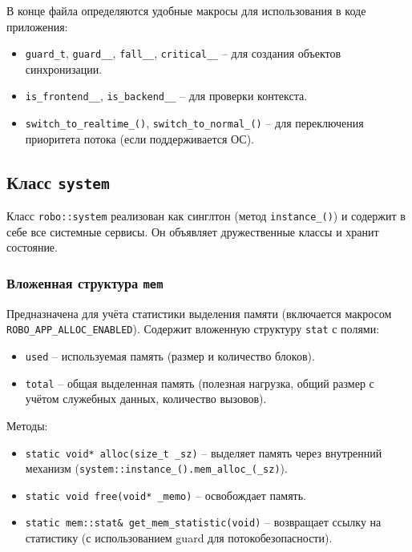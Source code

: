 \documentclass[a4paper,12pt]{article}
\begin{document}
В конце файла определяются удобные макросы для использования в коде приложения:
\begin{itemize}
    \item \texttt{guard\_t}, \texttt{guard\_\_}, \texttt{fall\_\_}, \texttt{critical\_\_} -- для создания объектов синхронизации.
    \item \texttt{is\_frontend\_\_}, \texttt{is\_backend\_\_} -- для проверки контекста.
    \item \texttt{switch\_to\_realtime\_()}, \texttt{switch\_to\_normal\_()} -- для переключения приоритета потока (если поддерживается ОС).
\end{itemize}

\subsection{Класс \texttt{system}}

Класс \texttt{robo::system} реализован как синглтон (метод \texttt{instance\_()}) и содержит в себе все системные сервисы. Он объявляет дружественные классы и хранит состояние.

\subsubsection{Вложенная структура \texttt{mem}}

Предназначена для учёта статистики выделения памяти (включается макросом \texttt{ROBO\_APP\_ALLOC\_ENABLED}). Содержит вложенную структуру \texttt{stat} с полями:
\begin{itemize}
    \item \texttt{used} -- используемая память (размер и количество блоков).
    \item \texttt{total} -- общая выделенная память (полезная нагрузка, общий размер с учётом служебных данных, количество вызовов).
\end{itemize}
Методы:
\begin{itemize}
    \item \texttt{static void* alloc(size\_t \_sz)} -- выделяет память через внутренний механизм (\texttt{system::instance\_().mem\_alloc\_(\_sz)}).
    \item \texttt{static void free(void* \_memo)} -- освобождает память.
    \item \texttt{static mem::stat\& get\_mem\_statistic(void)} -- возвращает ссылку на статистику (с использованием guard для потокобезопасности).
\end{itemize}
\end{document}
